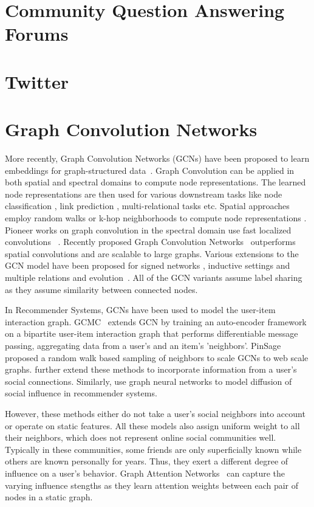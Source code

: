 \section{Community Question Answering Forums}


\section{Twitter}


\noindent
\section{Graph Convolution Networks}
More recently, Graph Convolution Networks (GCNs) have been proposed to learn embeddings for graph-structured data~\cite{Kipf:2016}. Graph Convolution can be applied in both spatial and spectral domains to compute node representations. The learned node representations are then used for various downstream tasks like node classification \cite{gcn}, link prediction \cite{relationalGCN}, multi-relational tasks \cite{rase} etc. Spatial approaches employ random walks or k-hop neighborhoods to compute node representations  \cite{DeepWalk, node2vec, Planetoid, LINE}. Pioneer works on graph convolution in the spectral domain use fast localized convolutions ~\cite{deferrard, duvenaund}. Recently proposed Graph Convolution Networks~\cite{gcn} outperforms spatial convolutions and are scalable to large graphs. Various extensions to the GCN model have been proposed for signed networks \cite{signedgcn}, inductive settings \cite{graphsage} and multiple relations \cite{DualGCN, relationalGCN} and evolution~\cite{dysat}. All of the GCN variants assume label sharing as they assume similarity between connected nodes.

In Recommender Systems, GCNs have been used to model the user-item interaction graph. GCMC~\cite{GCMC} extends GCN by training an auto-encoder framework on a  bipartite user-item interaction graph that performs differentiable message passing, aggregating data from a user's and an item's 'neighbors'. PinSage~\cite{PinSage} proposed a random walk based sampling of neighbors to scale GCNs to web scale graphs. \citet{fan2019} further extend these methods to incorporate information from a user's social connections.
Similarly, \citet{Diffnet} use graph neural networks to model diffusion of social influence in recommender systems.

However, these methods either do not take a user's social neighbors into account or operate on static features.  All these models also assign uniform weight to all their neighbors, which does not represent online social communities well. Typically in these communities, some friends are only superficially known while others are known personally for years. Thus, they exert a different degree of influence on a user's behavior. Graph Attention Networks~\cite{GAT} can capture the varying influence stengths as they learn attention weights between each pair of nodes in a static graph.

